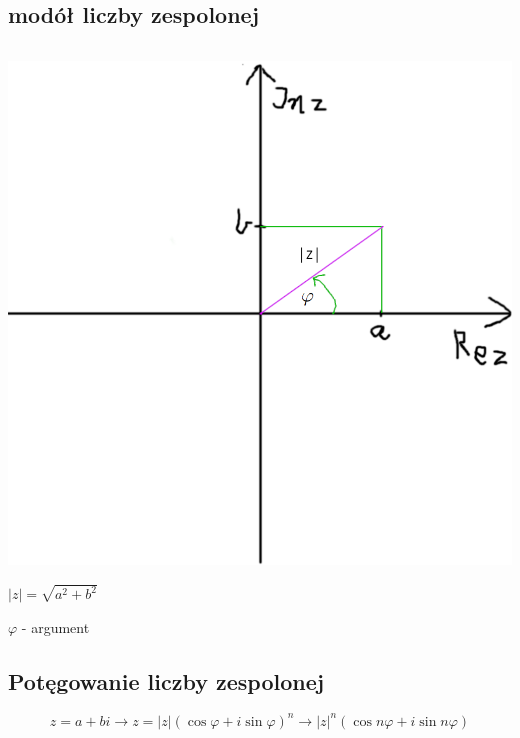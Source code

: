 \documentclass[11pt]{article}
\begin{document}
\subsection{modół liczby zespolonej}
\label{sec:org8f11203}
$$$$
\begin{center}
\includegraphics[width=.9\linewidth]{./figure01.png}
\end{center}

\(|z|=\sqrt{a^2+b^2}\)

\(\varphi\) - argument
\subsection{Potęgowanie liczby zespolonej}
\label{sec:orga23339d}
$$z=a+bi \to z=|z|(\cos \varphi + i \sin \varphi)^n \to |z|^n(\cos n \varphi + i \sin n \varphi)$$
\end{document}
